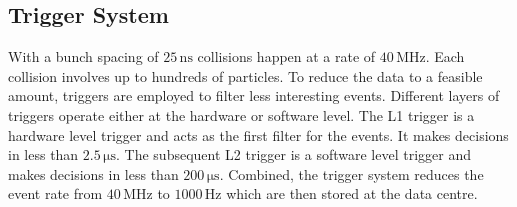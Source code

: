 \subsection{Trigger System}
With a bunch spacing of $25\,\unit{\nano\second}$ \cite{ATLAS:2019pzw} collisions happen at a rate of $40\,\unit{\mega\hertz}$. Each collision involves up to hundreds of particles. To reduce the data to a feasible amount, triggers are employed to filter less interesting events. Different layers of triggers operate either at the hardware or software level. The L1 trigger is a hardware level trigger and acts as the first filter for the events. It makes decisions in less than $2.5\,\unit{\micro\second}$. The subsequent L2 trigger is a software level trigger and makes decisions in less than $200\,\unit{\micro \second}$. Combined, the trigger system reduces the event rate from $40\,\unit{\mega\hertz}$ to $1000\,\unit{\hertz}$ which are then stored at the \cern data centre.
